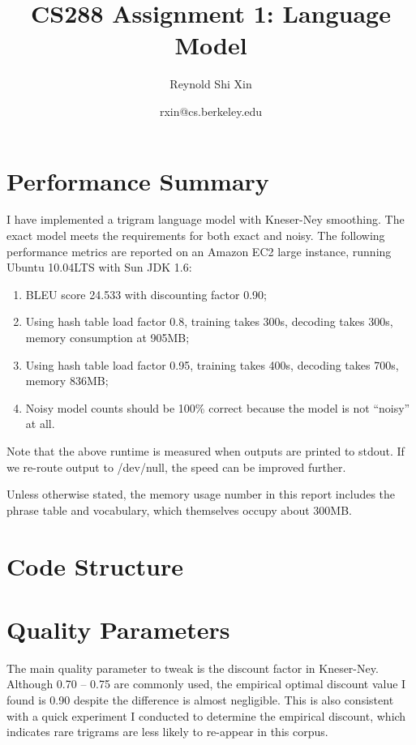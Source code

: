 \documentclass[12pt]{article}   %
\begin{document}
\title{CS288 Assignment 1: Language Model}   %
\author{Reynold Shi Xin}         %
\date{rxin@cs.berkeley.edu}    %
\maketitle

\section{Performance Summary}
I have implemented a trigram language model with Kneser-Ney smoothing. The exact model meets the requirements for both exact and noisy. The following performance metrics are reported on an Amazon EC2 large instance, running Ubuntu 10.04LTS with Sun JDK 1.6:
\begin{enumerate}
	\item BLEU score 24.533 with discounting factor 0.90;
	\item Using hash table load factor 0.8, training takes 300s, decoding takes 300s, memory consumption at 905MB;
	\item Using hash table load factor 0.95, training takes 400s, decoding takes 700s, memory 836MB;
	\item Noisy model counts should be 100\% correct because the model is not ``noisy'' at all.
\end{enumerate}

Note that the above runtime is measured when outputs are printed to stdout. If we re-route output to /dev/null, the speed can be improved further.

Unless otherwise stated, the memory usage number in this report includes the phrase table and vocabulary, which themselves occupy about 300MB.

\section{Code Structure}


\section{Quality Parameters}
The main quality parameter to tweak is the discount factor in Kneser-Ney. Although 0.70 -- 0.75 are commonly used, the empirical optimal discount value I found is 0.90 despite the difference is almost negligible. This is also consistent with a quick experiment I conducted to determine the empirical discount, which indicates rare trigrams are less likely to re-appear in this corpus.
\end{document}
